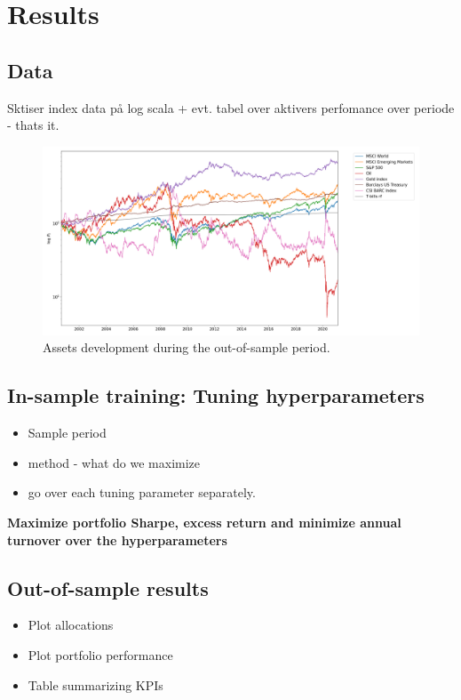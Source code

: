 \section{Results}

\subsection{Data}

Sktiser index data på log scala + evt. tabel over aktivers perfomance over periode - thats it.


\begin{figure}[H]
    \centering
    \includegraphics[width=1\textwidth]{analysis/portfolio_exercise/images/asset_vals.png}
    \caption{Assets development during the out-of-sample period.}
    \label{fig:MPC_data}
\end{figure}


\subsection{In-sample training: Tuning hyperparameters}

\begin{itemize}
    \item Sample period
    \item method - what do we maximize
    \item go over each tuning parameter separately.
\end{itemize}

\textbf{Maximize portfolio Sharpe, excess return and minimize annual turnover over the hyperparameters}

\subsection{Out-of-sample results}

\begin{itemize}
    \item Plot allocations
    \item Plot portfolio performance
    \item Table summarizing KPIs
\end{itemize}

